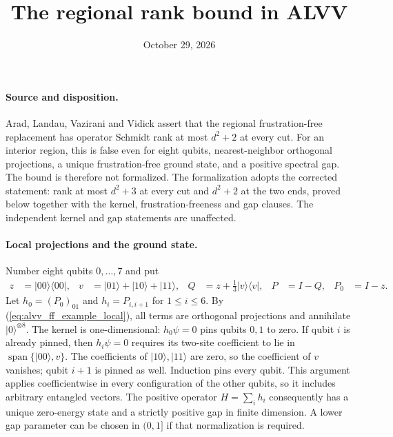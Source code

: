 \documentclass{article}
\title{The regional rank bound in ALVV}
\author{}
\date{October 29, 2026}
\begin{document}
\maketitle
{}

\paragraph{Source and disposition.}
Arad, Landau, Vazirani and Vidick
\cite[Definition~5.10 and Theorem~5.14(2)]{Arad2016RigorousRG} assert that the regional
frustration-free replacement has operator Schmidt rank at most $d^2+2$
at every cut. For an interior region, this is false even for eight qubits,
nearest-neighbor orthogonal projections, a unique frustration-free ground
state, and a positive spectral gap. The bound is therefore not formalized.
The formalization adopts the corrected statement: rank at most $d^2+3$ at
every cut and $d^2+2$ at the two ends, proved below together with the kernel,
frustration-freeness and gap clauses.
The independent kernel and gap statements are unaffected.

\paragraph{Local projections and the ground state.}
Number eight qubits $0,\ldots,7$ and put
\begin{align}
    z & =|00\rangle\langle00|,             &
    v & =|01\rangle+|10\rangle+|11\rangle, &
    Q & =z+\tfrac13|v\rangle\langle v|,    &
    P & =I-Q,                              & P_0 & =I-z.
    \label{eq:alvv_ff_example_local}
\end{align}
Let $h_0=(P_0)_{01}$ and $h_i=P_{i,i+1}$ for $1\le i\le6$.
By (\ref{eq:alvv_ff_example_local}), all terms are orthogonal projections and annihilate $|0\rangle^{\otimes8}$.
The kernel is one-dimensional: $h_0\psi=0$ pins qubits $0,1$ to zero.
If qubit $i$ is already pinned, then $h_i\psi=0$ requires its two-site
coefficient to lie in $\operatorname{span}\{|00\rangle,v\}$.
The coefficients of $|10\rangle,|11\rangle$ are zero, so the coefficient
of $v$ vanishes; qubit $i+1$ is pinned as well. Induction pins every qubit.
This argument applies coefficientwise in every configuration of the other
qubits, so it includes arbitrary entangled vectors.
The positive operator $H=\sum_i h_i$ consequently has a unique zero-energy
state and a strictly positive gap in finite dimension. A lower gap
parameter can be chosen in $(0,1]$ if that normalization is required.
\end{document}
